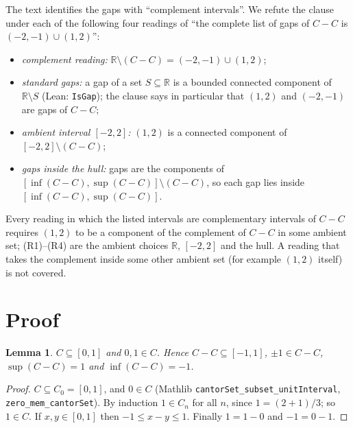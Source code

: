 \documentclass[11pt]{article}
\newtheorem{lemma}[theorem]{Lemma}
\theoremstyle{definition}
\theoremstyle{remark}
\begin{document}
The text identifies the gaps with ``complement intervals''. We refute the clause under each of the
following four readings of ``the complete list of gaps of $C-C$ is $(-2,-1)\cup(1,2)$'':
\begin{itemize}
\item[(R1)] \emph{complement reading:} $\mathbb R\setminus(C-C)=(-2,-1)\cup(1,2)$;
\item[(R2)] \emph{standard gaps:} a gap of a set $S\subseteq\mathbb R$ is a bounded connected
component of $\mathbb R\setminus S$ (Lean: \texttt{IsGap}); the clause says in particular that
$(1,2)$ and $(-2,-1)$ are gaps of $C-C$;
\item[(R3)] \emph{ambient interval $[-2,2]$:} $(1,2)$ is a connected component of
$[-2,2]\setminus(C-C)$;
\item[(R4)] \emph{gaps inside the hull:} gaps are the components of
$[\inf(C-C),\sup(C-C)]\setminus(C-C)$, so each gap lies inside $[\inf(C-C),\sup(C-C)]$.
\end{itemize}
Every reading in which the listed intervals are complementary intervals of $C-C$ requires
$(1,2)$ to be a component of the complement of $C-C$ in some ambient set; (R1)--(R4) are the ambient
choices $\mathbb R$, $[-2,2]$ and the hull. A reading that takes the complement inside some other
ambient set (for example $(1,2)$ itself) is not covered.

\section{Proof}

\begin{lemma}\label{lem:sub}
$C\subseteq[0,1]$ and $0,1\in C$. Hence $C-C\subseteq[-1,1]$, $\pm1\in C-C$,
$\sup(C-C)=1$ and $\inf(C-C)=-1$.
\end{lemma}
\begin{proof}
$C\subseteq C_0=[0,1]$, and $0\in C$ (Mathlib \texttt{cantorSet\_subset\_unitInterval},
\texttt{zero\_mem\_cantorSet}). By induction $1\in C_n$ for all $n$, since $1=(2+1)/3$; so $1\in C$.
If $x,y\in[0,1]$ then $-1\le x-y\le 1$. Finally $1=1-0$ and $-1=0-1$.
\end{proof}
\end{document}
